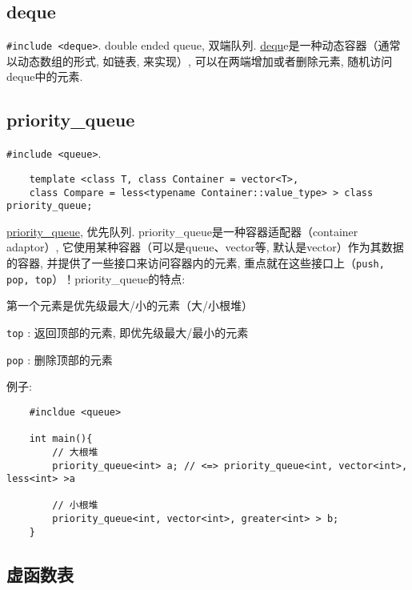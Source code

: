 \subsection{deque}
\texttt{#include <deque>}. double ended queue, 双端队列. \href{https://www.cplusplus.com/reference/deque/deque/?kw=deque}{dequ}e是一种动态容器（通常以动态数组的形式, 如链表, 来实现）, 可以在两端增加或者删除元素, 随机访问deque中的元素. 

\subsection{priority\_queue}
\texttt{#include <queue>}. 
\begin{verbatim}
	template <class T, class Container = vector<T>,
	class Compare = less<typename Container::value_type> > class priority_queue;
\end{verbatim}
\href{https://www.cplusplus.com/reference/queue/priority_queue/?kw=priority_queue}{priority\_queue}, 优先队列. priority\_queue是一种容器适配器（container adaptor）, 它使用某种容器（可以是queue、vector等, 默认是vector）作为其数据的容器, 并提供了一些接口来访问容器内的元素, 重点就在这些接口上（\texttt{push, pop, top}）！priority\_queue的特点: 
\begin{myitemize}
	\item 第一个元素是优先级最大/小的元素（大/小根堆）
	\item \texttt{top} : 返回顶部的元素, 即优先级最大/最小的元素
	\item \texttt{pop} : 删除顶部的元素
\end{myitemize}
例子: 
\begin{verbatim}
	#incldue <queue>
	
	int main(){
		// 大根堆
		priority_queue<int> a; // <=> priority_queue<int, vector<int>, less<int> >a
		
		// 小根堆
		priority_queue<int, vector<int>, greater<int> > b;
	}
\end{verbatim}


\subsection{虚函数表}